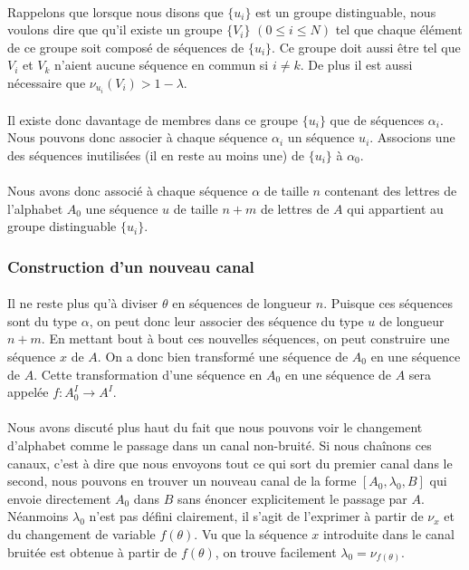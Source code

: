 	\paragraph{}
	Rappelons que lorsque nous disons que $\{u_i\}$ est un groupe distinguable,
	nous voulons dire que qu'il existe un groupe $\{V_i\}$ $(0 \le i \le N)$ 
	tel que chaque élément de ce groupe soit composé de séquences de $\{u_i\}$.
	Ce groupe doit aussi être tel que $ V_i$ et $V_k$ n'aient aucune séquence
	en commun si $i\neq k$. De plus il est aussi nécessaire que
	$\nu_{u_i}(V_i) > 1-\lambda$. 
	
	\paragraph{}
	Il existe donc davantage de membres dans ce groupe $\{u_i\}$ que de 
	séquences $\alpha_i$. Nous pouvons donc associer à chaque séquence 
	$\alpha_i$ un séquence $u_i$. Associons une des séquences inutilisées 
	(il en reste au moins une) de $\{u_i\}$ à $\alpha_0$.
	
	\paragraph{}
	Nous avons donc associé à chaque séquence $\alpha$ de taille $n$ contenant 
	des lettres de l'alphabet $A_0$ une séquence $u$ de taille $n+m$ de
	lettres de $A$ qui appartient au groupe distinguable $\{u_i\}$. 
	
\subsubsection*{Construction d'un nouveau canal}
	
	\paragraph{}
	Il ne reste plus qu'à diviser $\theta$ en séquences de longueur $n$. 
	Puisque ces séquences sont du type $\alpha$, on peut donc leur 
	associer des séquence du type $u$ de longueur $n+m$. En mettant bout à bout
	ces nouvelles séquences, on peut construire une séquence $x$ de $A$. 
	On a donc bien transformé une séquence de $A_0$ en une séquence de $A$. 
	Cette transformation d'une séquence en $A_0$ en une séquence de $A$ sera 
	appelée $f : A_0^I \to A^I$.
	
	\paragraph{}
	Nous avons discuté plus haut du fait que nous pouvons voir le changement
	d'alphabet comme le passage dans un canal non-bruité. Si nous chaînons 
	ces canaux, c'est à dire que nous envoyons tout ce qui sort du premier 
	canal dans le second, nous pouvons en trouver un nouveau canal de la 
	forme $[A_0,\lambda_0,B]$ qui envoie directement $A_0$ dans $B$ 
	sans énoncer explicitement le passage par $A$. Néanmoins $\lambda_0$ 
	n'est pas défini clairement, il s'agit de l'exprimer à partir de 
	$\nu_x$ et du changement de variable $f(\theta)$. 
	Vu que la séquence $x$ introduite dans le canal bruitée est obtenue à 
	partir de $f(\theta)$, on trouve facilement $\lambda_0=\nu_{f(\theta)}$.
	
